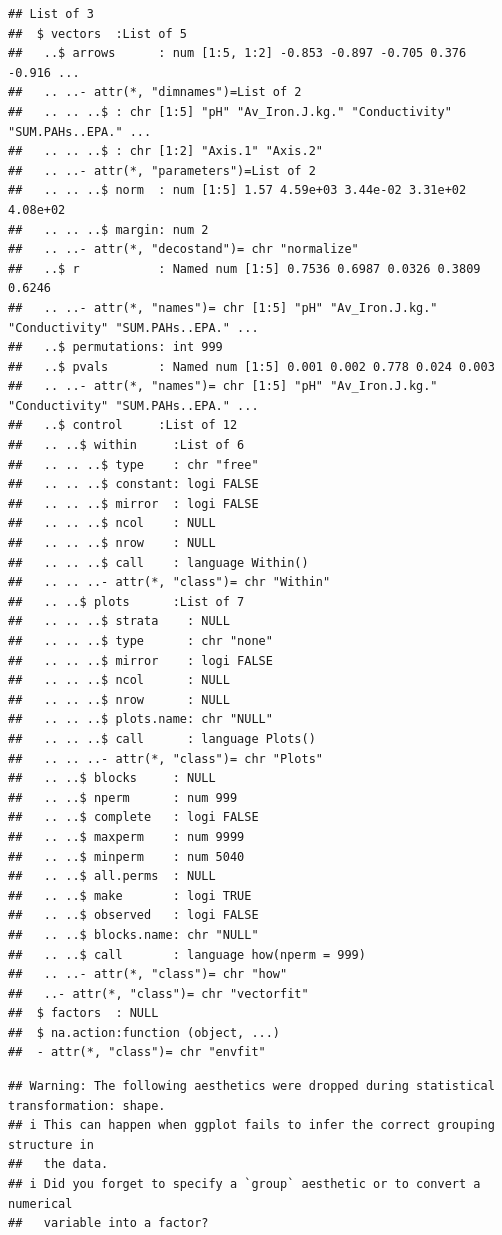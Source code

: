 \documentclass[
]{article}
\begin{document}
\begin{verbatim}
## List of 3
##  $ vectors  :List of 5
##   ..$ arrows      : num [1:5, 1:2] -0.853 -0.897 -0.705 0.376 -0.916 ...
##   .. ..- attr(*, "dimnames")=List of 2
##   .. .. ..$ : chr [1:5] "pH" "Av_Iron.J.kg." "Conductivity" "SUM.PAHs..EPA." ...
##   .. .. ..$ : chr [1:2] "Axis.1" "Axis.2"
##   .. ..- attr(*, "parameters")=List of 2
##   .. .. ..$ norm  : num [1:5] 1.57 4.59e+03 3.44e-02 3.31e+02 4.08e+02
##   .. .. ..$ margin: num 2
##   .. ..- attr(*, "decostand")= chr "normalize"
##   ..$ r           : Named num [1:5] 0.7536 0.6987 0.0326 0.3809 0.6246
##   .. ..- attr(*, "names")= chr [1:5] "pH" "Av_Iron.J.kg." "Conductivity" "SUM.PAHs..EPA." ...
##   ..$ permutations: int 999
##   ..$ pvals       : Named num [1:5] 0.001 0.002 0.778 0.024 0.003
##   .. ..- attr(*, "names")= chr [1:5] "pH" "Av_Iron.J.kg." "Conductivity" "SUM.PAHs..EPA." ...
##   ..$ control     :List of 12
##   .. ..$ within     :List of 6
##   .. .. ..$ type    : chr "free"
##   .. .. ..$ constant: logi FALSE
##   .. .. ..$ mirror  : logi FALSE
##   .. .. ..$ ncol    : NULL
##   .. .. ..$ nrow    : NULL
##   .. .. ..$ call    : language Within()
##   .. .. ..- attr(*, "class")= chr "Within"
##   .. ..$ plots      :List of 7
##   .. .. ..$ strata    : NULL
##   .. .. ..$ type      : chr "none"
##   .. .. ..$ mirror    : logi FALSE
##   .. .. ..$ ncol      : NULL
##   .. .. ..$ nrow      : NULL
##   .. .. ..$ plots.name: chr "NULL"
##   .. .. ..$ call      : language Plots()
##   .. .. ..- attr(*, "class")= chr "Plots"
##   .. ..$ blocks     : NULL
##   .. ..$ nperm      : num 999
##   .. ..$ complete   : logi FALSE
##   .. ..$ maxperm    : num 9999
##   .. ..$ minperm    : num 5040
##   .. ..$ all.perms  : NULL
##   .. ..$ make       : logi TRUE
##   .. ..$ observed   : logi FALSE
##   .. ..$ blocks.name: chr "NULL"
##   .. ..$ call       : language how(nperm = 999)
##   .. ..- attr(*, "class")= chr "how"
##   ..- attr(*, "class")= chr "vectorfit"
##  $ factors  : NULL
##  $ na.action:function (object, ...)  
##  - attr(*, "class")= chr "envfit"
\end{verbatim}

\begin{verbatim}
## Warning: The following aesthetics were dropped during statistical transformation: shape.
## i This can happen when ggplot fails to infer the correct grouping structure in
##   the data.
## i Did you forget to specify a `group` aesthetic or to convert a numerical
##   variable into a factor?
\end{verbatim}
\end{document}
